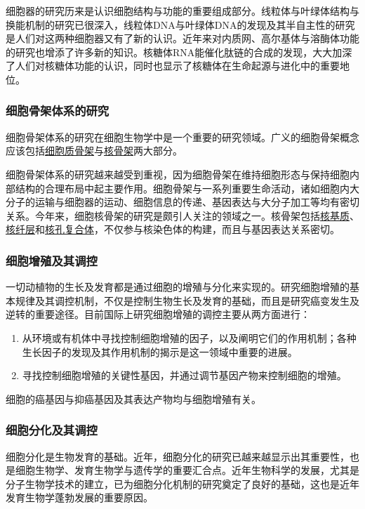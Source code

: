 细胞器的研究历来是认识细胞结构与功能的重要组成部分。线粒体与叶绿体结构与换能机制的研究已很深入，线粒体DNA与叶绿体DNA的发现及其半自主性的研究是人们对这两种细胞器又有了新的认识。近年来对内质网、高尔基体与溶酶体功能的研究也增添了许多新的知识。核糖体RNA能催化肽链的合成的发现，大大加深了人们对核糖体功能的认识，同时也显示了核糖体在生命起源与进化中的重要地位。

\subsubsection{细胞骨架体系的研究}

细胞骨架体系的研究在细胞生物学中是一个重要的研究领域。广义的细胞骨架概念应该包括\underline{细胞质骨架}与\underline{核骨架}两大部分。

细胞骨架体系的研究越来越受到重视，因为细胞骨架在维持细胞形态与保持细胞内部结构的合理布局中起主要作用。细胞骨架与一系列重要生命活动，诸如细胞内大分子的运输与细胞器的运动、细胞信息的传递、基因表达与大分子加工等均有密切关系。今年来，细胞核骨架的研究是颇引人关注的领域之一。核骨架包括\underline{核基质}、\underline{核纤层}和\underline{核孔复合体}，不仅参与核染色体的构建，而且与基因表达关系密切。

\subsubsection{细胞增殖及其调控}

一切动植物的生长及发育都是通过细胞的增殖与分化来实现的。研究细胞增殖的基本规律及其调控机制，不仅是控制生物生长及发育的基础，而且是研究癌变发生及逆转的重要途径。目前国际上研究细胞增殖的调控主要从两方面进行：

\begin{enumerate}
	\item 从环境或有机体中寻找控制细胞增殖的因子，以及阐明它们的作用机制；各种生长因子的发现及其作用机制的揭示是这一领域中重要的进展。
	\item 寻找控制细胞增殖的关键性基因，并通过调节基因产物来控制细胞的增殖。
\end{enumerate}

细胞的癌基因与抑癌基因及其表达产物均与细胞增殖有关。

\subsubsection{细胞分化及其调控}

细胞分化是生物发育的基础。近年，细胞分化的研究已越来越显示出其重要性，也是细胞生物学、发育生物学与遗传学的重要汇合点。近年生物科学的发展，尤其是分子生物学技术的建立，已为细胞分化机制的研究奠定了良好的基础，这也是近年发育生物学蓬勃发展的重要原因。


